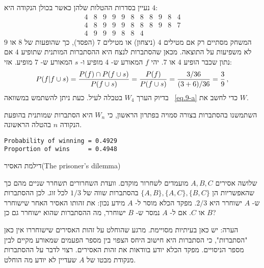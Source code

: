 

נעיין בסדרות ההטלות שלהן כאשר בכולן הנקודה היא
$4$:
\[
\begin{array}{rrrrrrrrrrr}
4 & 8 & 9 & 9 & 9 & 8 & 8 & 8 & 9 & 8 & 4\\
4 & 8 & 9 & 9 & 9 & 8 & 8 & 8 & 9 & 8 & 7\\
4 & 9 & 9 & 9 & 8 & 8 & 4
\end{array}
\]
המשחק מסתיים רק אם מטילים 
$4$
(ניצחון) או מטילים
$7$
(הפסד), כך שהופעות של 
$8$
או
$9$
לא משפיעות על התוצאה. מכאן שהסתברות לנצח היא ההסתברות המותנית שתופיע
$4$
אם נתון שכבר הופיע
$4$
או
$7$. 
יהי 
$f$
המאורע ש-%
$4$
מופיע ו-%
$s$
המאורע ש-%
$7$
מופיע. אזי:
\[
P(f|f\cup s) = \displaystyle\frac{P(f)\cap P(f\cup s)}{P(f\cup s)}=\displaystyle\frac{P(f)}{P(f\cup s)}=\displaystyle\frac{3/36}{(3+6)/36}=\displaystyle\frac{3}{9}\,,
\]
בדיוק הערך
$W_4$
בטבלה לעיל. כעת ניתן להשתמש במשוואה%
~\ref{eq.9-a}
כדי לחשב את
$W$.

השתמשנו בהסתברות בצורה סמויה בפתרון הראשון, כי 
$W_n$
היא הסתברות שמותנית בהופעת הנקודה
$n$
בהטלה הראשונה.

\sml{}
\begin{verbatim}
Probability of winning = 0.4929
Proportion of wins     = 0.4948
\end{verbatim}








\begin{prob}{דילמת האסיר}{}{(The prisoner's dilemma)}

שלושה אסירים 
$A,B,C$
מועמדים לשחרור מוקדם. וועדת השחרורים תשחרר שניים מהם כך שהאפשריות הן
$\{A,B\}, \{A,C\}, \{B,C\}$
בהסתברות שווה של
$1/3$
לכל זוג. לכן ההסתברות ש-%
$A$
ישוחרר היא
$2/3$.
מפקד הכלא מוסר ל-%
$A$
מידע נכון: את זהותו האסיר האחר שישוחרר 
$B$
או
$C$.
אם ל-%
$A$
נמסר ש-%
$B$
ישוחרר, מה ההסתברות שהוא ישוחרר גם כן?

הערה: יש כאן בעיתיות מסויימת. מרגע שהוחלט על זהות האסירים שישוחררו אין כאן "הסתברות", כי הסתברות היא חישוב היחס הצפוי בין מספר הפעמים שמאורע מקיים לבין מספר הניסויים. מפקד הכלא יודע בוודאות את זהות האסירים. רצוי לדבר על ההסתברות מנקודת מבטו של 
$A$ 
שעדיין לא יודע מה הוחלט.
\end{prob}

